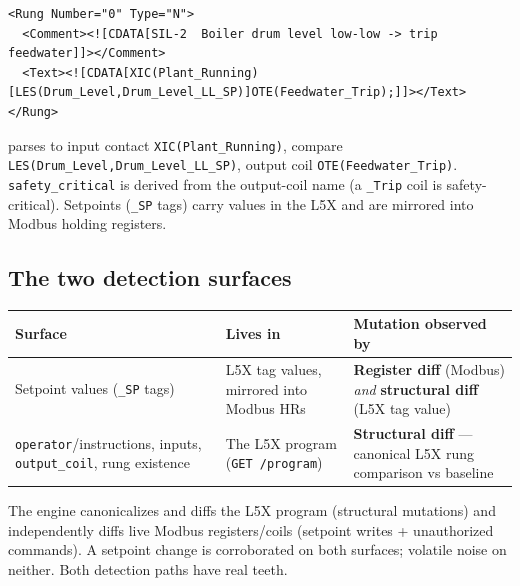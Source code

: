 \documentclass[11pt,a4paper]{article}
\newcommand{\code}[1]{\texttt{\small #1}}
\begin{document}
\begin{lstlisting}
<Rung Number="0" Type="N">
  <Comment><![CDATA[SIL-2  Boiler drum level low-low -> trip feedwater]]></Comment>
  <Text><![CDATA[XIC(Plant_Running)[LES(Drum_Level,Drum_Level_LL_SP)]OTE(Feedwater_Trip);]]></Text>
</Rung>
\end{lstlisting}

parses to input contact \code{XIC(Plant\_Running)}, compare \code{LES(Drum\_Level,Drum\_Level\_LL\_SP)},
output coil \code{OTE(Feedwater\_Trip)}. \code{safety\_critical} is derived from the output-coil name (a
\code{*\_Trip} coil is safety-critical). Setpoints (\code{*\_SP} tags) carry values in the L5X and are
mirrored into Modbus holding registers.

\subsection{The two detection surfaces}
\begin{tabularx}{\textwidth}{@{}L p{3.6cm} L@{}}
\toprule
\textbf{Surface} & \textbf{Lives in} & \textbf{Mutation observed by} \\
\midrule
Setpoint values (\code{*\_SP} tags) & L5X tag values, mirrored into Modbus HRs & \textbf{Register diff} (Modbus) \emph{and} \textbf{structural diff} (L5X tag value) \\
\code{operator}/instructions, inputs, \code{output\_coil}, rung existence & The L5X program (\code{GET /program}) & \textbf{Structural diff} --- canonical L5X rung comparison vs baseline \\
\bottomrule
\end{tabularx}

\smallskip
The engine canonicalizes and diffs the L5X program (structural mutations) and independently diffs live
Modbus registers/coils (setpoint writes + unauthorized commands). A setpoint change is corroborated on
both surfaces; volatile noise on neither. Both detection paths have real teeth.
\end{document}
